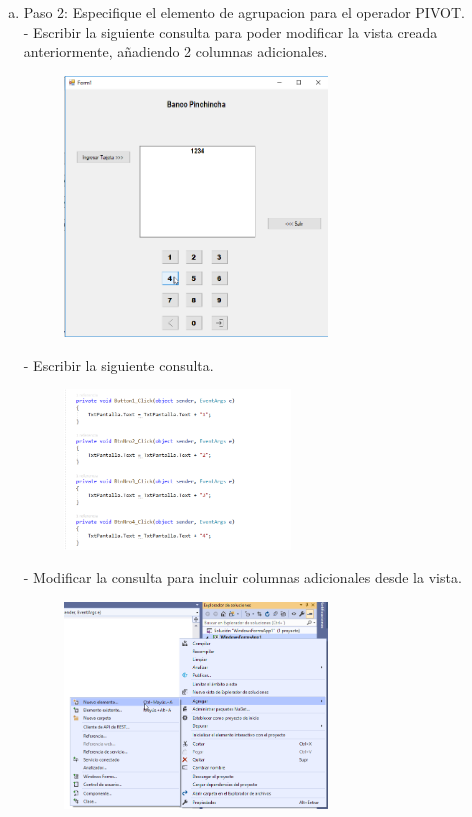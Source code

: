 \begin{enumerate}[1.]
\begin{enumerate}[a)]
\begin{figure}[H]
\begin{center}
		\end{center}
		\end{figure}
	\item Paso 2: Especifique el elemento de agrupacion para el operador PIVOT. \\
		-  Escribir la siguiente consulta para poder modificar la vista creada anteriormente, añadiendo 2 columnas adicionales. 
		\begin{figure}[H]
		\begin{center}
		\includegraphics[width=7cm]{./Imagenes/img3}
		\end{center}
		\end{figure}
		-  Escribir la siguiente consulta. 
		\begin{figure}[H]
		\begin{center}
		\includegraphics[width=6cm]{./Imagenes/img4}
		\end{center}
		\end{figure}
		-  Modificar la consulta para incluir columnas adicionales desde la vista. 
		\begin{figure}[H]
		\begin{center}
		\includegraphics[width=7cm]{./Imagenes/img5}

\end{center}
\end{figure}
\end{enumerate}
\end{enumerate}
